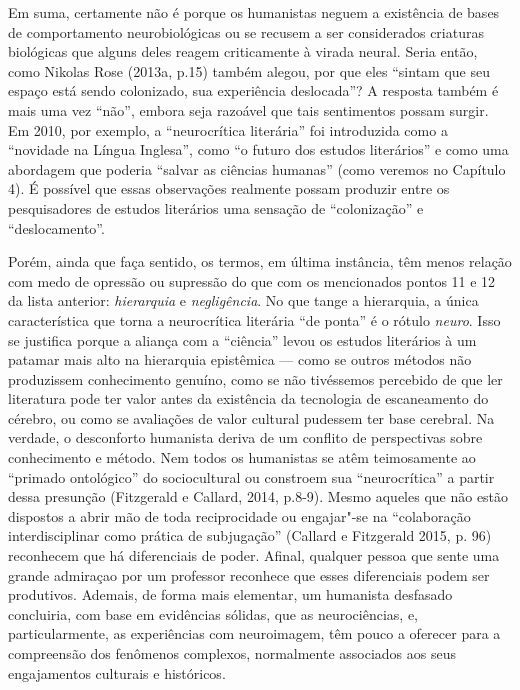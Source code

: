 Em suma, certamente não é porque os humanistas neguem a existência de
bases de comportamento neurobiológicas ou se recusem a ser considerados
criaturas biológicas que alguns deles reagem criticamente à virada
neural. Seria então, como Nikolas Rose (2013a, p.15) também alegou, por
que eles ``sintam que seu espaço está sendo colonizado, sua experiência
deslocada''? A resposta também é mais uma vez ``não'', embora seja
razoável que tais sentimentos possam surgir. Em 2010, por exemplo, a
``neurocrítica literária'' foi introduzida como a ``novidade na Língua
Inglesa'', como ``o futuro dos estudos literários'' e como uma abordagem
que poderia ``salvar as ciências humanas'' (como veremos no Capítulo 4).
É possível que essas observações realmente possam produzir entre os
pesquisadores de estudos literários uma sensação de ``colonização'' e
``deslocamento''.

Porém, ainda que faça sentido, os termos, em última instância, têm menos
relação com medo de opressão ou supressão do que com os mencionados
pontos 11 e 12 da lista anterior: \emph{hierarquia} e
\emph{negligência}. No que tange a hierarquia, a única característica
que torna a neurocrítica literária ``de ponta'' é o rótulo \emph{neuro}.
Isso se justifica porque a aliança com a ``ciência'' levou os estudos
literários à um patamar mais alto na hierarquia epistêmica --- como se
outros métodos não produzissem conhecimento genuíno, como se não
tivéssemos percebido de que ler literatura pode ter valor antes da
existência da tecnologia de escaneamento do cérebro, ou como se
avaliações de valor cultural pudessem ter base cerebral. Na verdade, o
desconforto humanista deriva de um conflito de perspectivas sobre
conhecimento e método. Nem todos os humanistas se atêm teimosamente ao
``primado ontológico'' do sociocultural ou constroem sua
``neurocrítica'' a partir dessa presunção (Fitzgerald e Callard, 2014,
p.8-9). Mesmo aqueles que não estão dispostos a abrir mão de toda
reciprocidade ou engajar"-se na ``colaboração interdisciplinar como
prática de subjugação'' (Callard e Fitzgerald 2015, p. 96) reconhecem
que há diferenciais de poder. Afinal, qualquer pessoa que sente uma
grande admiraçao por um professor reconhece que esses diferenciais podem
ser produtivos. Ademais, de forma mais elementar, um humanista desfasado
concluiria, com base em evidências sólidas, que as neurociências, e,
particularmente, as experiências com neuroimagem, têm pouco a oferecer
para a compreensão dos fenômenos complexos, normalmente associados aos
seus engajamentos culturais e históricos.


